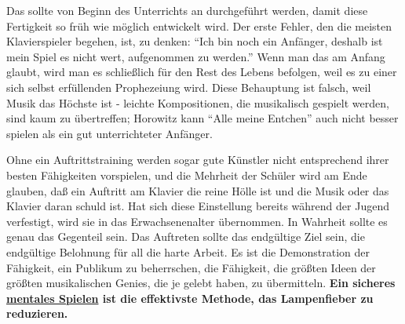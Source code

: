 Das sollte von Beginn des Unterrichts an durchgeführt werden, damit diese Fertigkeit so früh wie möglich entwickelt wird.
Der erste Fehler, den die meisten Klavierspieler begehen, ist, zu denken: \enquote{Ich bin noch ein Anfänger, deshalb ist mein Spiel es nicht wert, aufgenommen zu werden.}
Wenn man das am Anfang glaubt, wird man es schließlich für den Rest des Lebens befolgen, weil es zu einer sich selbst erfüllenden Prophezeiung wird.
Diese Behauptung ist falsch, weil Musik das Höchste ist - leichte Kompositionen, die musikalisch gespielt werden, sind kaum zu übertreffen; Horowitz kann \enquote{Alle meine Entchen} auch nicht besser spielen als ein gut unterrichteter Anfänger.

Ohne ein Auftrittstraining werden sogar gute Künstler nicht entsprechend ihrer besten Fähigkeiten vorspielen, und die Mehrheit der Schüler wird am Ende glauben, daß ein Auftritt am Klavier die reine Hölle ist und die Musik oder das Klavier daran schuld ist.
Hat sich diese Einstellung bereits während der Jugend verfestigt, wird sie in das Erwachsenenalter übernommen.
In Wahrheit sollte es genau das Gegenteil sein.
Das Auftreten sollte das endgültige Ziel sein, die endgültige Belohnung für all die harte Arbeit.
Es ist die Demonstration der Fähigkeit, ein Publikum zu beherrschen, die Fähigkeit, die größten Ideen der größten musikalischen Genies, die je gelebt haben, zu übermitteln.
\textbf{Ein sicheres \hyperref[c1ii12mental]{mentales Spielen} ist die effektivste Methode, das Lampenfieber zu reduzieren.}

